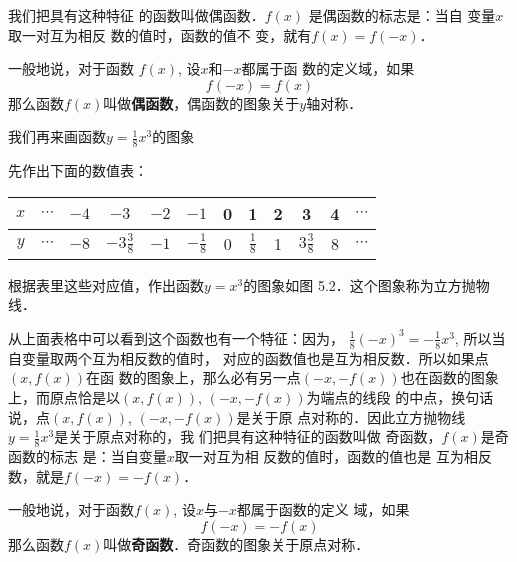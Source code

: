 我们把具有这种特征
的函数叫做偶函数．$f(x)$
是偶函数的标志是：当自
变量$x$取一对互为相反
数的值时，函数的值不
变，就有$f(x)=f(-x)$．

一般地说，对于函数
$f(x)$, 设$x$和$-x$都属于函
数的定义域，如果
\[f(-x)=f(x)\]
那么函数$f(x)$叫做\textbf{偶函数}，偶函数的图象关于$y$轴对称．

我们再来画函数$y=\frac{1}{8}x^3$的图象

先作出下面的数值表：
\begin{center}
\begin{tabular}{c|ccccccccccc}
    \hline
    $x$ &$\cdots$&$-4$&$-3$&$-2$&$-1$&0&1&2&3&4&$\cdots$\\
\hline
$y$ &$\cdots$&$-8$&$-3\tfrac{3}{8}$&$-1$&$-\tfrac{1}{8}$&0&$\tfrac{1}{8}$&1&$3\tfrac{3}{8}$&8&$\cdots$\\
\hline
\end{tabular}
\end{center}

根据表里这些对应值，作出函数$y=x^3$的图象如图
5.2．这个图象称为立方抛物线．
\begin{figure}[htp]
    \centering
{}
    \caption{}
\end{figure}

从上面表格中可以看到这个函数也有一个特征：因为，
$\frac{1}{8}(-x)^3=-\frac{1}{8}x^3$, 所以当自变量取两个互为相反数的值时，
对应的函数值也是互为相反数．所以如果点$(x,f(x))$在函
数的图象上，那么必有另一点$(-x,-f(x))$也在函数的图象
上，而原点恰是以$(x,f(x))$, $(-x,-f(x))$为端点的线段
的中点，换句话说，点$(x,f(x))$, $(-x,-f(x))$是关于原
点对称的．因此立方抛物线
$y=\frac{1}{8}x^3$是关于原点对称的，我
们把具有这种特征的函数叫做
奇函数，$f(x)$是奇函数的标志
是：当自变量$x$取一对互为相
反数的值时，函数的值也是
互为相反数，就是$f(-x)=-f(x)$．

一般地说，对于函数$f(x)$, 设$x$与$-x$都属于函数的定义
域，如果$$f(-x)=-f(x)$$ 那么函数$f(x)$叫做\textbf{奇函数}．奇函数的图象关于原点对称．

